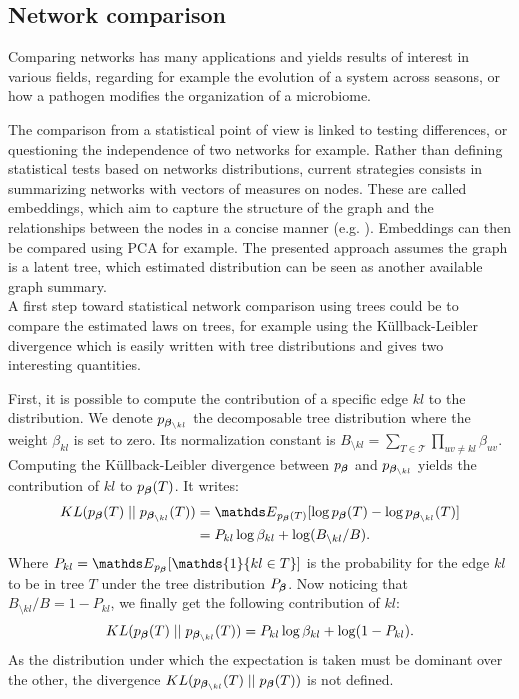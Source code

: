 \subsection{Network comparison}
 
Comparing networks has many applications and  yields results of interest in various fields, regarding for example the evolution of a system across seasons, or how a pathogen modifies the organization of a microbiome.

The comparison from a statistical point of view is linked to testing differences, or questioning the independence of two networks for example.  Rather than defining statistical tests based on networks distributions, current strategies consists in summarizing networks with vectors of measures on nodes. These are called embeddings, which aim to capture the structure of the graph and the relationships between the nodes in a concise manner (e.g. \citet{TMK18,CK19}). Embeddings can then be compared using PCA for example. The presented approach assumes the graph is a latent tree, which estimated distribution can be seen as another available graph summary.\\

A first step toward statistical network comparison using trees could be to compare the estimated laws on trees, for example using the Küllback-Leibler divergence which is easily written with tree distributions and gives two interesting quantities.

First, it is possible to compute the contribution of a specific edge $kl$ to the distribution. We denote $p_{{\boldsymbol{\beta}}_{\setminus kl}}$ the  decomposable tree distribution where the weight $\beta_{kl}$ is set to zero. Its normalization constant is  $B_{\setminus kl}=\sum_{T\in\mathcal{T}} \prod_{uv\neq kl} \beta_{uv}$. Computing the Küllback-Leibler divergence between $p_{\boldsymbol{\beta}}$ and $p_{{\boldsymbol{\beta}}_{\setminus kl}}$ yields  the contribution of $kl$ to $p_{\boldsymbol{\beta}}(T)$. It writes:
\begin{align*}
KL( p_\betabf (T)\mid\mid p_{\betabf_{\setminus kl}} (T)) &= \Esp_{p_\betabf (T)} [\log p_\betabf (T) - \log p_{\betabf_{\setminus kl}} (T)]\\
&=P_{kl} \log \beta_{kl} + \log ( B_{\setminus kl}/B).
\end{align*}
Where $P_{kl} = \Esp_{p_{\betabf}}[\mathds{1}\{kl\in T\}]$ is the probability for the edge $kl$ to be in tree $T$ under the tree distribution $P_{{\boldsymbol{\beta}}}$. Now noticing that $B_{\setminus kl}/B=1-P_{kl}$, we finally get the following contribution of $kl$:
$$KL( p_{\boldsymbol{\beta}} (T)\mid\mid p_{{\boldsymbol{\beta}}_{\setminus kl}} (T)) =P_{kl} \log \beta_{kl} + \log (1-P_{kl}).$$
As the distribution under which the expectation is taken must be dominant over the other, the divergence $KL(p_{{\boldsymbol{\beta}}_{\setminus kl}} (T)\mid\mid p_{\boldsymbol{\beta}} (T)) $ is not defined.


